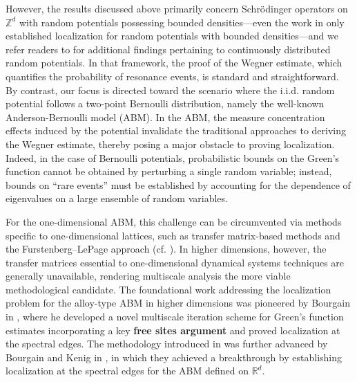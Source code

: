 \documentclass[11pt,reqno,UTF8,twoside]{amsart}
\newcommand{\Z}{\mathbb{Z}}
\theoremstyle{definition}
\numberwithin{equation}{section}
\begin{document}
However, the results discussed above primarily concern Schrödinger operators on $\Z^d$ with random potentials possessing bounded densities—even the work in \cite{JLMS85} only established localization for random potentials with bounded densities—and we refer readers to \cite{Kir08, AW15, AM93} for additional findings pertaining to continuously distributed random potentials. In that framework, the proof of the Wegner estimate, which quantifies the probability of resonance events, is standard and straightforward. By contrast, our focus is directed toward the scenario where the i.i.d. random potential follows a two-point Bernoulli distribution, namely the well-known Anderson-Bernoulli model (ABM). In the ABM, the measure concentration effects induced by the potential invalidate the traditional approaches to deriving the Wegner estimate, thereby posing a major obstacle to proving localization. Indeed, in the case of Bernoulli potentials, probabilistic bounds on the Green’s function cannot be obtained by perturbing a single random variable; instead, bounds on ``rare events'' must be established by accounting for the dependence of eigenvalues on a large ensemble of random variables.


For the one-dimensional ABM, this challenge can be circumvented via methods specific to one-dimensional lattices, such as transfer matrix-based methods and the Furstenberg–LePage approach (cf. \cite{CKM87,SVW98,DSS02}). In higher dimensions, however, the transfer matrices essential to one-dimensional dynamical systems techniques are generally unavailable, rendering multiscale analysis the more viable methodological candidate. The foundational work addressing the localization problem for the alloy-type ABM in higher dimensions was pioneered by Bourgain in \cite{Bou04}, where he developed a novel multiscale iteration scheme for Green’s function estimates incorporating a key {\bf free sites argument} and proved localization at the spectral edges. The methodology introduced in \cite{Bou04} was further advanced by Bourgain and Kenig in \cite{BK05}, in which they achieved a breakthrough by establishing localization at the spectral edges for the ABM defined on $\mathbb{R}^d$.
\end{document}
